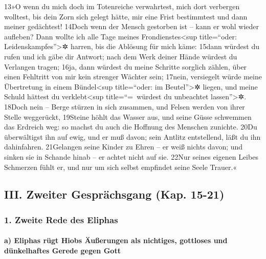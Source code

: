 13»O wenn du mich doch im Totenreiche verwahrtest, mich dort verbergen
wolltest, bis dein Zorn sich gelegt hätte, mir eine Frist bestimmtest
und dann meiner gedächtest! 14Doch wenn der Mensch gestorben ist -- kann
er wohl wieder aufleben? Dann wollte ich alle Tage meines
Frondienstes\textless sup title=``oder: Leidenskampfes''\textgreater✲
harren, bis die Ablösung für mich käme: 15dann würdest du rufen und ich
gäbe dir Antwort; nach dem Werk deiner Hände würdest du Verlangen
tragen; 16ja, dann würdest du meine Schritte sorglich zählen, über einen
Fehltritt von mir kein strenger Wächter sein; 17nein, versiegelt würde
meine Übertretung in einem Bündel\textless sup title=``oder: im
Beutel''\textgreater✲ liegen, und meine Schuld hättest du
verklebt\textless sup title=``=~würdest du unbeachtet
lassen''\textgreater✲. 18Doch nein -- Berge stürzen in sich zusammen,
und Felsen werden von ihrer Stelle weggerückt, 19Steine höhlt das Wasser
aus, und seine Güsse schwemmen das Erdreich weg: so machst du auch die
Hoffnung des Menschen zunichte. 20Du überwältigst ihn auf ewig, und er
muß davon; sein Antlitz entstellend, läßt du ihn dahinfahren. 21Gelangen
seine Kinder zu Ehren -- er weiß nichts davon; und sinken sie in Schande
hinab -- er achtet nicht auf sie. 22Nur seines eigenen Leibes Schmerzen
fühlt er, und nur um sich selbst empfindet seine Seele Trauer.«

\hypertarget{iii.-zweiter-gespruxe4chsgang-kap.-15-21}{%
\subsection{III. Zweiter Gesprächsgang (Kap.
15-21)}\label{iii.-zweiter-gespruxe4chsgang-kap.-15-21}}

\hypertarget{zweite-rede-des-eliphas}{%
\subsubsection{1. Zweite Rede des
Eliphas}\label{zweite-rede-des-eliphas}}

\hypertarget{a-eliphas-ruxfcgt-hiobs-uxe4uuxdferungen-als-nichtiges-gottloses-und-duxfcnkelhaftes-gerede-gegen-gott}{%
\paragraph{a) Eliphas rügt Hiobs Äußerungen als nichtiges, gottloses und
dünkelhaftes Gerede gegen
Gott}\label{a-eliphas-ruxfcgt-hiobs-uxe4uuxdferungen-als-nichtiges-gottloses-und-duxfcnkelhaftes-gerede-gegen-gott}}

